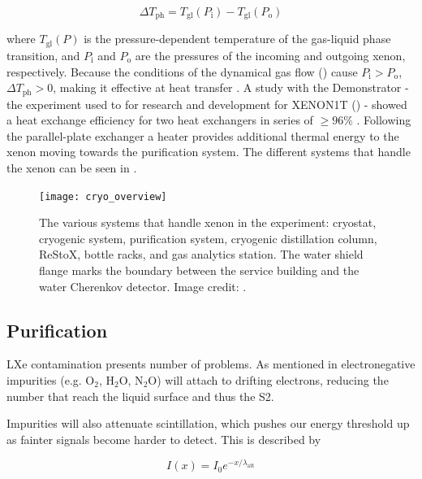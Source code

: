 \begin{equation}
\Delta T_{\mathrm{ph}} = T_{\mathrm{gl}} (P_{\mathrm{i}}) - T_{\mathrm{gl}} (P_{\mathrm{o}})
\label{eq:xenon1t_cryo_latent}
\end{equation}

\noindent where $T_{\mathrm{gl}} (P)$ is the pressure-dependent temperature of the gas-liquid phase transition, and $P_{\mathrm{i}}$ and
$P_{\mathrm{o}}$
are the pressures of the incoming and outgoing xenon, respectively.  Because the conditions of the dynamical gas flow
() cause $P_{\mathrm{i}} > P_{\mathrm{o}}$, $\Delta T_{\mathrm{ph}} > 0$, making it effective at heat transfer
.  A study with the Demonstrator - the
experiment used to for research and development for XENON1T () - showed a heat
exchange efficiency for
two heat exchangers in series of $\geq 96\%$ .  Following the parallel-plate exchanger a heater provides additional
thermal energy to the xenon moving towards the purification system.  The different systems that handle the xenon can be seen in
.

\begin{figure}
\centering
\texttt{[image: cryo\_overview]}
\caption{The various systems that handle xenon in the experiment: cryostat, cryogenic system, purification system, cryogenic distillation
column, ReStoX, bottle racks, and gas analytics station.  The water shield flange marks the boundary between the service building and the
water Cherenkov detector.  Image credit: .}
\label{fig:xenon1t_cryo_overview}
\end{figure}



\subsection{Purification}
\label{subsec:xenon1t_pur}
LXe contamination presents number of problems.  As mentioned in  electronegative
impurities (e.g. O$_2$, H$_2$O, N$_2$O) will attach to drifting electrons, reducing the number that reach
the liquid surface and thus the S2.

Impurities will also attenuate scintillation, which pushes our energy threshold up as fainter signals become harder to detect.  This is
described by

\begin{equation}
I(x) = I_0 e^{-x / \lambda_{\mathrm{att}}}
\label{eq:xenon1t_pur_atten}
\end{equation}


